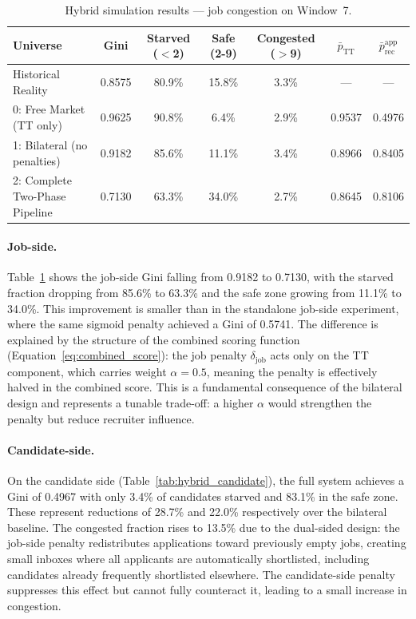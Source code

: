 \begin{table}[H]
    \centering
    \caption{Hybrid simulation results --- job congestion on Window~7.}
    \label{tab:hybrid_job}
    \small
    \begin{tabular}{lcccccc}
        \toprule
        \textbf{Universe} & \textbf{Gini} & \textbf{Starved ($<$2)} & \textbf{Safe (2-9)}
            & \textbf{Congested ($>$9)} & $\bar{p}_\text{TT}$ & $\bar{p}_{\text{rec}}^{\text{app}}$ \\
        \midrule
        Historical Reality & 0.8575 & 80.9\% & 15.8\% & 3.3\% & --- & --- \\
        0: Free Market (TT only)    & 0.9625 & 90.8\% &  6.4\% & 2.9\% & 0.9537 & 0.4976 \\
        1: Bilateral (no penalties) & 0.9182 & 85.6\% & 11.1\% & 3.4\% & 0.8966 & 0.8405 \\
        2: Complete Two-Phase Pipeline & 0.7130 & 63.3\% & 34.0\% & 2.7\% & 0.8645 & 0.8106 \\
        \bottomrule
    \end{tabular}
    \par\smallskip
    \raggedright\small
\end{table}

\paragraph{Job-side.}
Table~\ref{tab:hybrid_job} shows the job-side Gini falling from
0.9182 to 0.7130, with the starved fraction dropping from 85.6\% to
63.3\% and the safe zone growing from 11.1\% to 34.0\%. This
improvement is smaller than in the standalone job-side experiment,
where the same sigmoid penalty achieved a Gini of 0.5741. The
difference is explained by the structure of the combined scoring
function (Equation~\ref{eq:combined_score}): the job penalty
$\delta_\text{job}$ acts only on the \gls{TT} component, which
carries weight $\alpha = 0.5$, meaning the penalty is effectively
halved in the combined score. This is a fundamental consequence of the bilateral design
and represents a tunable trade-off: a higher $\alpha$ would strengthen
the penalty but reduce recruiter influence.
 
\paragraph{Candidate-side.}
On the candidate side (Table~\ref{tab:hybrid_candidate}), the full
system achieves a Gini of 0.4967 with only 3.4\% of candidates
starved and 83.1\% in the safe zone. These represent reductions of 28.7\% and
22.0\% respectively over the bilateral baseline. The congested
fraction rises to 13.5\% due to the dual-sided design: the job-side
penalty redistributes applications toward previously empty jobs,
creating small inboxes where all applicants are automatically
shortlisted, including candidates already frequently shortlisted
elsewhere. The candidate-side penalty suppresses this effect but
cannot fully counteract it, leading to a small increase in
congestion.
 
